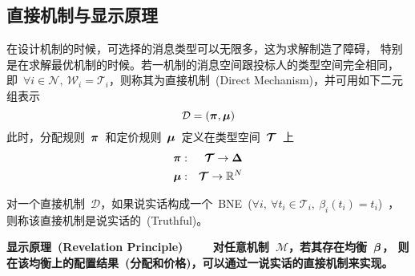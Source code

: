 \documentclass[a4paper,12pt]{article}
\newcommand{\mv}[1]{\mbox{\boldmath$#1$}}         %
\begin{document}
 \subsection{直接机制与显示原理}\label{sec:survey:direct:mechanism}

在设计机制的时候，可选择的消息类型可以无限多，这为求解制造了障碍，
特别是在求解最优机制的时候。若一机制的消息空间跟投标人的类型空间完全相同，
即~$\forall
i\in\mathcal{N},~\mathcal{W}_i=\mathcal{T}_i$，则称其为直接机制~(Direct
Mechanism)，并可用如下二元组表示
 \begin{equation}\label{mech:definition:direct:mechanism}
    \mathcal{D} = (\mv{\pi},\mv{\mu})
\end{equation}
此时，分配规则~$\mv{\pi}$~和定价规则~$\mv{\mu}$~定义在类型空间~$\mv{\mathcal{T}}$~上
\begin{eqnarray}
  \mv{\pi}&:&\mv{\mathcal{T}}\rightarrow\mv{\Delta} \\
  \mv{\mu}&:&\mv{\mathcal{T}}\rightarrow\mathbb{R}^N
\end{eqnarray}

对一个直接机制~$\mathcal{D}$，如果说实话构成一个~BNE~($\forall
i,~\forall
t_i\in\mathcal{T}_i,~\beta_i(t_i)=t_i$)~，则称该直接机制是说实话的~(Truthful)。\vspace{5pt}

\textbf{显示原理~(Revelation Principle)~~~~
对任意机制~$\mathcal{M}$，若其存在均衡~$\mv{\beta}$，
则在该均衡上的配置结果~(分配和价格)，可以通过一说实话的直接机制来实现。}\vspace{5pt}
\end{document}
